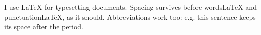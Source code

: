 \documentclass{article}
\newcommand{\latex}{\LaTeX\xspace}
\newcommand{\eg}{e.g.\xspace}
\begin{document}
I use \latex for typesetting documents.
Spacing survives before words\latex and punctuation\latex, as it should.
Abbreviations work too: \eg this sentence keeps its space after the period.
\end{document}
